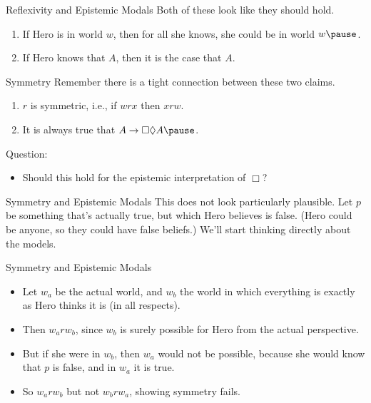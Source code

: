 \documentclass[
  14pt,
  letterpaper,
  ignorenonframetext,
]{beamer}
\providecommand{\tightlist}{%
  \setlength{\itemsep}{0pt}\setlength{\parskip}{0pt}}\usepackage{longtable,booktabs,array}
\begin{document}
\begin{frame}{Reflexivity and Epistemic Modals}
\protect\hypertarget{reflexivity-and-epistemic-modals}{}
Both of these look like they should hold.

\begin{enumerate}
\tightlist
\item
  If Hero is in world \(w\), then for all she knows, she could be in
  world \(w \pause\).
\item
  If Hero knows that \(A\), then it is the case that \(A\).
\end{enumerate}
\end{frame}

\begin{frame}{Symmetry}
\protect\hypertarget{symmetry}{}
Remember there is a tight connection between these two claims.

\begin{enumerate}
\tightlist
\item
  \(r\) is symmetric, i.e., if \(wrx\) then \(xrw\).
\item
  It is always true that \(A \rightarrow \Box \Diamond A \pause\).
\end{enumerate}

Question:

\begin{itemize}
\tightlist
\item
  Should this hold for the epistemic interpretation of \(\Box\)?
\end{itemize}
\end{frame}

\begin{frame}{Symmetry and Epistemic Modals}
\protect\hypertarget{symmetry-and-epistemic-modals}{}
This does not look particularly plausible. Let \(p\) be something that's
actually true, but which Hero believes is false. (Hero could be anyone,
so they could have false beliefs.) We'll start thinking directly about
the models.
\end{frame}

\begin{frame}{Symmetry and Epistemic Modals}
\protect\hypertarget{symmetry-and-epistemic-modals-1}{}
\begin{itemize}
\tightlist
\item
  Let \(w_a\) be the actual world, and \(w_b\) the world in which
  everything is exactly as Hero thinks it is (in all respects).
\item
  Then \(w_arw_b\), since \(w_b\) is surely possible for Hero from the
  actual perspective.
\item
  But if she were in \(w_b\), then \(w_a\) would not be possible,
  because she would know that \(p\) is false, and in \(w_a\) it is true.
\item
  So \(w_arw_b\) but not \(w_brw_a\), showing symmetry fails.
\end{itemize}
\end{frame}
\end{document}
